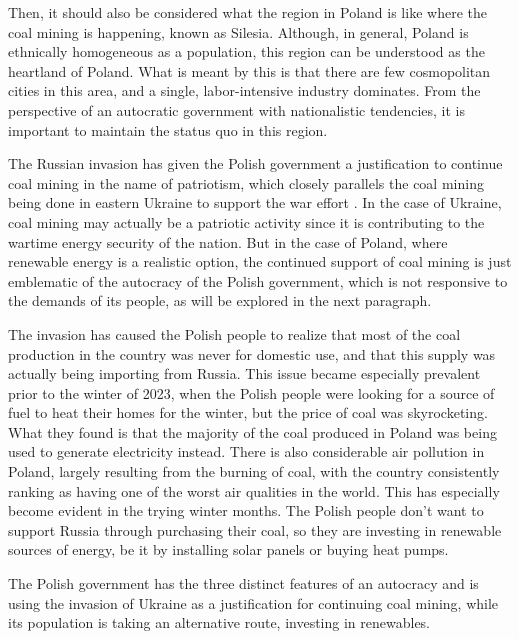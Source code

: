 \documentclass[12pt,letterpaper]{article}
\begin{document}
\begin{flushleft}
Then, it should also be considered what the region in Poland is like where the coal mining is happening, known as Silesia. Although, in general, Poland is ethnically homogeneous as a population, this region can be understood as the heartland of Poland. What is meant by this is that there are few cosmopolitan cities in this area, and a single, labor-intensive industry dominates. From the perspective of an autocratic government with nationalistic tendencies, it is important to maintain the status quo in this region.

The Russian invasion has given the Polish government a justification to continue coal mining in the name of patriotism, which closely parallels the coal mining being done in eastern Ukraine to support the war effort \autocite{rott_eastern_2022}. In the case of Ukraine, coal mining may actually be a patriotic activity since it is contributing to the wartime energy security of the nation. But in the case of Poland, where renewable energy is a realistic option, the continued support of coal mining is just emblematic of the autocracy of the Polish government, which is not responsive to the demands of its people, as will be explored in the next paragraph.

The invasion has caused the Polish people to realize that most of the coal production in the country was never for domestic use, and that this supply was actually being importing from Russia. This issue became especially prevalent prior to the winter of 2023, when the Polish people were looking for a source of fuel to heat their homes for the winter, but the price of coal was skyrocketing. What they found is that the majority of the coal produced in Poland was being used to generate electricity instead. There is also considerable air pollution in Poland, largely resulting from the burning of coal, with the country consistently ranking as having one of the worst air qualities in the world. This has especially become evident in the trying winter months. \autocite{tilles_polish_2022} The Polish people don't want to support Russia through purchasing their coal, so they are investing in renewable sources of energy, be it by installing solar panels or buying heat pumps. \autocite{noauthor_heat_2022}

The Polish government has the three distinct features of an autocracy and is using the invasion of Ukraine as a justification for continuing coal mining, while its population is taking an alternative route, investing in renewables.

\newpage

\printbibliography


\end{flushleft}
\end{document}
